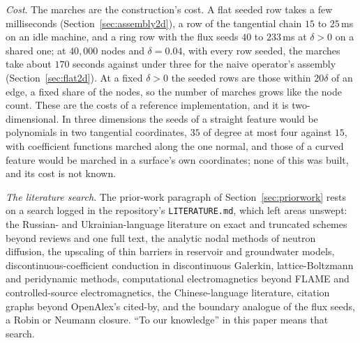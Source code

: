 \documentclass[11pt]{amsart}
\theoremstyle{definition}
\theoremstyle{remark}
\newcommand{\para}[1]{\par\smallskip\noindent\textit{#1}.\enspace}
\begin{document}
\para{Cost}
The marches are the construction's cost. A flat seeded row takes a few
milliseconds (Section~\ref{sec:assembly2d}), a row of the tangential chain
$15$ to $25$\,ms on an idle machine, and a ring row with the flux seeds
$40$ to $233$\,ms at $\delta > 0$ on a shared one; at $40{,}000$ nodes and
$\delta = 0.04$, with every row seeded, the marches take about $170$ seconds
against under three for the naive operator's assembly
(Section~\ref{sec:flat2d}). At a fixed $\delta > 0$ the seeded rows are
those within $20\delta$ of an edge, a fixed share of the nodes, so the
number of marches grows like the node count. These are the costs of a
reference implementation, and it is two-dimensional. In three dimensions
the seeds of a straight feature would be polynomials in two tangential
coordinates, $35$ of degree at most four against $15$, with coefficient
functions marched along the one normal, and those of a curved feature
would be marched in a surface's own coordinates; none of this was built,
and its cost is not known.

\para{The literature search}
The prior-work paragraph of Section~\ref{sec:priorwork} rests on a search
logged in the repository's \texttt{LITERATURE.md}, which left areas
unswept: the Russian- and Ukrainian-language literature on exact and
truncated schemes beyond reviews and one full text, the analytic nodal
methods of neutron diffusion, the upscaling of thin barriers in reservoir
and groundwater models, discontinuous-coefficient conduction in
discontinuous Galerkin, lattice-Boltzmann and peridynamic methods,
computational electromagnetics beyond FLAME and controlled-source
electromagnetics, the Chinese-language literature, citation graphs beyond
OpenAlex's cited-by, and the boundary analogue of the flux seeds, a Robin
or Neumann closure. ``To our knowledge'' in this paper means that search.
\end{document}

